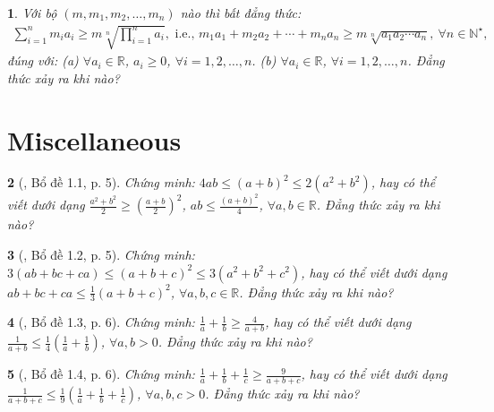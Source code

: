 \documentclass{article}
\newtheorem{baitoan}{}
\begin{document}
\begin{baitoan}
	Với bộ $(m,m_1,m_2,\ldots,m_n)$ nào thì bất đẳng thức:
	\begin{align*}
		\sum_{i=1}^n m_ia_i\ge m\sqrt[n]{\prod_{i=1}^n a_i},\mbox{ i.e., } m_1a_1 + m_2a_2 + \cdots + m_na_n\ge m\sqrt[n]{a_1a_2\cdots a_n},\ \forall n\in\mathbb{N}^\star,
	\end{align*}
	đúng với: (a) $\forall a_i\in\mathbb{R}$, $a_i\ge0$, $\forall i = 1,2,\ldots,n$. (b) $\forall a_i\in\mathbb{R}$, $\forall i = 1,2,\ldots,n$.
	Đẳng thức xảy ra khi nào?
\end{baitoan}



\section{Miscellaneous}

\begin{baitoan}[\cite{Son_Nghiep_Trung_Can2021}, Bổ đề 1.1, p. 5]
	Chứng minh: $4ab\le(a + b)^2\le2(a^2 + b^2)$, hay có thể viết dưới dạng $\frac{a^2 + b^2}{2}\ge\left(\frac{a + b}{2}\right)^2$, $ab\le\frac{(a + b)^2}{4}$, $\forall a,b\in\mathbb{R}$. Đẳng thức xảy ra khi nào?
\end{baitoan}

\begin{baitoan}[\cite{Son_Nghiep_Trung_Can2021}, Bổ đề 1.2, p. 5]
	Chứng minh: $3(ab + bc + ca)\le(a + b + c)^2\le3(a^2 + b^2 + c^2)$, hay có thể viết dưới dạng $ab + bc + ca\le\frac{1}{3}(a + b + c)^2$, $\forall a,b,c\in\mathbb{R}$. Đẳng thức xảy ra khi nào?
\end{baitoan}

\begin{baitoan}[\cite{Son_Nghiep_Trung_Can2021}, Bổ đề 1.3, p. 6]
	Chứng minh: $\frac{1}{a} + \frac{1}{b}\ge\frac{4}{a + b}$, hay có thể viết dưới dạng $\frac{1}{a + b}\le\frac{1}{4}\left(\frac{1}{a} + \frac{1}{b}\right)$, $\forall a,b > 0$. Đẳng thức xảy ra khi nào?
\end{baitoan}

\begin{baitoan}[\cite{Son_Nghiep_Trung_Can2021}, Bổ đề 1.4, p. 6]
	Chứng minh: $\frac{1}{a} + \frac{1}{b} + \frac{1}{c}\ge\frac{9}{a + b + c}$, hay có thể viết dưới dạng $\frac{1}{a + b + c}\le\frac{1}{9}\left(\frac{1}{a} + \frac{1}{b} + \frac{1}{c}\right)$, $\forall a,b,c > 0$. Đẳng thức xảy ra khi nào?
\end{baitoan}
\end{document}
